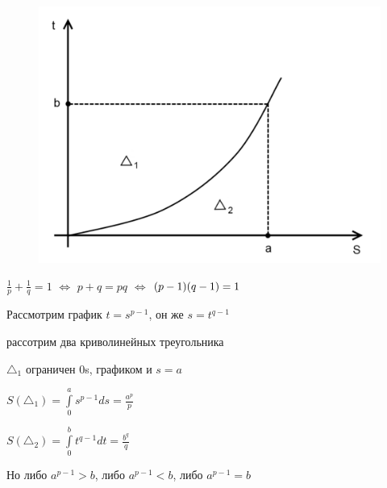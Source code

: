 \documentclass[a4paper]{report}
\newcommand*{\hm}[1]{#1\nobreak\discretionary{}%
            {\hbox{$\mathsurround=0pt #1$}}{}}
\begin{document}
\begin{figure}
\includegraphics[width=\linewidth]{5}
\end{figure}

$\frac1p+\frac1q=1$ $\Leftrightarrow$ $p+q=pq$ $\Leftrightarrow$ $(p\hm-1)(q-1)=1$

Рассмотрим график $t=s^{p-1}$, он же $s=t^{q-1}$

рассотрим два криволинейных треугольника

$\triangle_1$ ограничен 0s, графиком и $s=a$

$S(\triangle_1)=\displaystyle\int\limits_0^a s^{p-1}ds=\frac{a^p}{p}$

$S(\triangle_2)=\displaystyle\int\limits_0^b t^{q-1}dt=\frac{b^q}{q}$

Но либо $a^{p-1}>b$, либо $a^{p-1}<b$, либо $a^{p-1}=b$
\end{document}

